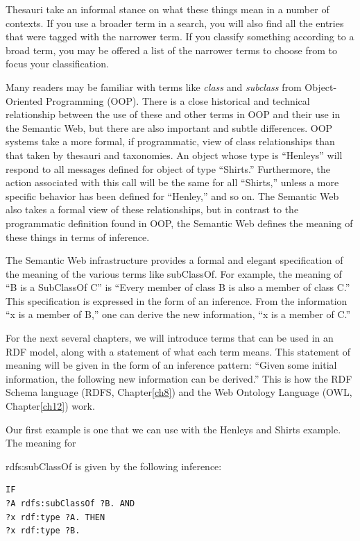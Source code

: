 Thesauri take an informal stance on what these things mean in a number
of contexts. If you use
a broader term in a search, you will also find all the entries that were
tagged with the narrower term. If you classify something according to a
broad term, you may be offered a list of the narrower terms to choose
from to focus your classification.

\begin{sidebar}{}
Many readers may be familiar with terms like \emph{class} and
\emph{subclass} from Object-Oriented Programming (OOP). There is a close
historical and technical relationship between the use of these and other
terms in OOP and their use in the Semantic Web, but there are also
important and subtle differences. OOP systems take a more formal, if
programmatic, view of class relationships than that taken by thesauri
and taxonomies. An object whose type is ``Henleys'' will respond to all
messages defined for object of type ``Shirts.'' Furthermore, the action
associated with this call will be the same for all ``Shirts,'' unless a
more specific behavior has been defined for ``Henley,'' and so on. The
Semantic Web also takes a formal view of these relationships, but in
contrast to the programmatic definition found in OOP, the Semantic Web
defines the meaning of these things in terms of inference.
\end{sidebar}


The Semantic Web infrastructure provides a formal and elegant
specification of the meaning of the various terms like subClassOf. For
example, the meaning of ``B is a SubClassOf C'' is ``Every member of
class B is also a member of class C.'' This specification is expressed
in the form of an inference. From the information ``x is a member of
B,'' one can derive the new information, ``x is a member of C.''

For the next several chapters, we will introduce terms that can be used
in an RDF model, along with a statement of what each term means. This
statement of meaning will be given in the form of an inference pattern:
``Given some initial information, the following new information can be
derived.'' This is how the RDF Schema language (RDFS, Chapter\ref{ch8}) and the
Web Ontology Language (OWL, Chapter\ref{ch12}) work.

Our first example is one that we can use with the Henleys and Shirts
example. The meaning for

rdfs:subClassOf is given by the following inference:

\begin{lstlisting}
IF
?A rdfs:subClassOf ?B. AND
?x rdf:type ?A. THEN
?x rdf:type ?B.
\end{lstlisting}

